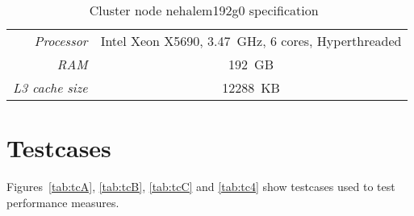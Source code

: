 \begin{appendices}
\begin{table}[!ht]
  \begin{center}
    \begin{tabular}{rc}
      \hline
      \emph{Processor}     & Intel Xeon X5690, 3.47~GHz, 6 cores, Hyperthreaded \\
      \emph{RAM}           & 192~GB \\
      \emph{L3 cache size} & 12288~KB \\
      \hline
    \end{tabular}
    \caption{Cluster node nehalem192g0 specification~\cite{intelX5690}}
    \label{setup:cluster}
  \end{center}
\end{table}


\chapter{Testcases}
\label{app:tc}
%
Figures~\ref{tab:tcA}, \ref{tab:tcB}, \ref{tab:tcC} and \ref{tab:tc4} show testcases used to test performance measures.


\end{appendices}
